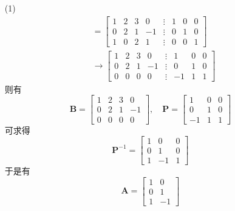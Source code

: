 \documentclass[12pt, a4paper, oneside, fontset=none]{ctexart}
\begin{document}
\begin{enumerate}
    \item[(1)]
        \begin{align*}
            [\bm{A} \vdots \bm{I}] & = \begin{bmatrix}
                                           1 & 2 & 3 & 0  & \vdots & 1 & 0 & 0 \\
                                           0 & 2 & 1 & -1 & \vdots & 0 & 1 & 0 \\
                                           1 & 0 & 2 & 1  & \vdots & 0 & 0 & 1
                                       \end{bmatrix}    \\
                                   & \to \begin{bmatrix}
                                             1 & 2 & 3 & 0  & \vdots & 1  & 0 & 0 \\
                                             0 & 2 & 1 & -1 & \vdots & 0  & 1 & 0 \\
                                             0 & 0 & 0 & 0  & \vdots & -1 & 1 & 1
                                         \end{bmatrix}
        \end{align*}
        则有
        $$
            \bm{B} = \begin{bmatrix}
                1 & 2 & 3 & 0  \\
                0 & 2 & 1 & -1 \\
                0 & 0 & 0 & 0
            \end{bmatrix},\quad
            \bm{P} = \begin{bmatrix}
                1  & 0 & 0 \\
                0  & 1 & 0 \\
                -1 & 1 & 1
            \end{bmatrix}
        $$
        可求得
        $$
            \bm{P}^{-1} = \begin{bmatrix}
                1 & 0  & 0 \\
                0 & 1  & 0 \\
                1 & -1 & 1
            \end{bmatrix}
        $$
        于是有
        $$
            \bm{A} = \begin{bmatrix}
                1 & 0  \\
                0 & 1  \\
                1 & -1

\end{bmatrix}$$
\end{enumerate}
\end{document}
